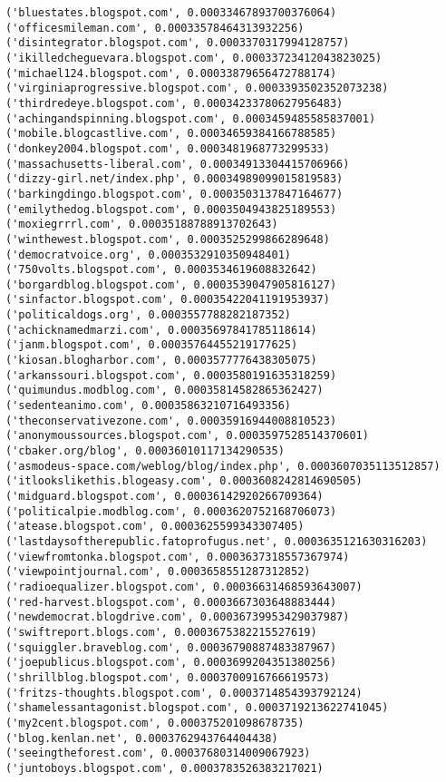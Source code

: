 \documentclass[11pt]{article}
\begin{document}
\begin{Verbatim}[commandchars=\\\{\}]
('bluestates.blogspot.com', 0.00033467893700376064)
('officesmileman.com', 0.00033578464313932256)
('disintegrator.blogspot.com', 0.0003370317994128757)
('ikilledcheguevara.blogspot.com', 0.00033723412043823025)
('michael124.blogspot.com', 0.00033879656472788174)
('virginiaprogressive.blogspot.com', 0.0003393502352073238)
('thirdredeye.blogspot.com', 0.00034233780627956483)
('achingandspinning.blogspot.com', 0.0003459485585837001)
('mobile.blogcastlive.com', 0.00034659384166788585)
('donkey2004.blogspot.com', 0.0003481968773299533)
('massachusetts-liberal.com', 0.00034913304415706966)
('dizzy-girl.net/index.php', 0.00034989099015819583)
('barkingdingo.blogspot.com', 0.0003503137847164677)
('emilythedog.blogspot.com', 0.0003504943825189553)
('moxiegrrrl.com', 0.00035188788913702643)
('winthewest.blogspot.com', 0.0003525299866289648)
('democratvoice.org', 0.0003532910350948401)
('750volts.blogspot.com', 0.0003534619608832642)
('borgardblog.blogspot.com', 0.0003539047905816127)
('sinfactor.blogspot.com', 0.00035422041191953937)
('politicaldogs.org', 0.0003557788282187352)
('achicknamedmarzi.com', 0.00035697841785118614)
('janm.blogspot.com', 0.00035764455219177625)
('kiosan.blogharbor.com', 0.0003577776438305075)
('arkanssouri.blogspot.com', 0.0003580191635318259)
('quimundus.modblog.com', 0.00035814582865362427)
('sedenteanimo.com', 0.00035863210716493356)
('theconservativezone.com', 0.00035916944008810523)
('anonymoussources.blogspot.com', 0.0003597528514370601)
('cbaker.org/blog', 0.00036010117134290535)
('asmodeus-space.com/weblog/blog/index.php', 0.0003607035113512857)
('itlookslikethis.blogeasy.com', 0.0003608242814690505)
('midguard.blogspot.com', 0.00036142920266709364)
('politicalpie.modblog.com', 0.0003620752168706073)
('atease.blogspot.com', 0.0003625599343307405)
('lastdaysoftherepublic.fatoprofugus.net', 0.0003635121630316203)
('viewfromtonka.blogspot.com', 0.0003637318557367974)
('viewpointjournal.com', 0.0003658551287312852)
('radioequalizer.blogspot.com', 0.00036631468593643007)
('red-harvest.blogspot.com', 0.0003667303648883444)
('newdemocrat.blogdrive.com', 0.00036739953429037987)
('swiftreport.blogs.com', 0.0003675382215527619)
('squiggler.braveblog.com', 0.00036790887483387967)
('joepublicus.blogspot.com', 0.0003699204351380256)
('shrillblog.blogspot.com', 0.0003700916766619573)
('fritzs-thoughts.blogspot.com', 0.0003714854393792124)
('shamelessantagonist.blogspot.com', 0.0003719213622741045)
('my2cent.blogspot.com', 0.000375201098678735)
('blog.kenlan.net', 0.0003762943764404438)
('seeingtheforest.com', 0.00037680314009067923)
('juntoboys.blogspot.com', 0.0003783526383217021)

\end{Verbatim}
\end{document}
